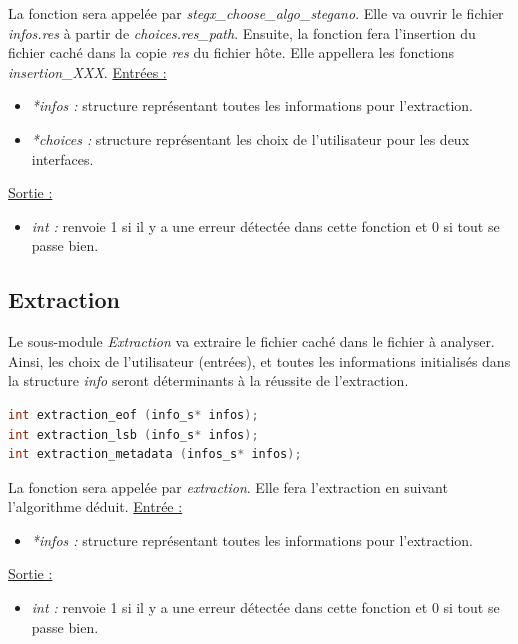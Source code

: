 \documentclass[11pt]{article}
\begin{document}
La fonction sera appelée par \textit{stegx\_choose\_algo\_stegano}.
Elle va ouvrir le fichier \textit{infos.res} à partir de 
\textit{choices.res\_path}. 
Ensuite, la fonction fera l'insertion du fichier caché dans la copie 
\textit{res} du fichier hôte. 
Elle appellera les fonctions \textit{insertion\_XXX}. 
\newline
\underline{Entrées :} 
\begin{itemize}
\item \textit{*infos :} structure représentant toutes les informations pour 
l'extraction.  
\item \textit{*choices :} structure représentant les choix de 
l'utilisateur pour les deux interfaces. 
\end{itemize}
\underline{Sortie :} 
\begin{itemize}
\item \textit{int :} renvoie 1 si il y a une erreur détectée dans cette 
fonction et 0 si tout se passe bien.  
\newline 
\end{itemize}

\subsection{Extraction}

Le sous-module \textit{Extraction} va extraire le fichier caché dans le 
fichier à analyser. Ainsi, les choix de l'utilisateur (entrées), et toutes les
informations initialisés dans la structure \textit{info} seront déterminants 
à la réussite de l'extraction. 

\begin{lstlisting}[language=c]
int extraction_eof (info_s* infos); 
int extraction_lsb (info_s* infos);
int extraction_metadata (infos_s* infos);
\end{lstlisting}

La fonction sera appelée par \textit{extraction}.
Elle fera l'extraction en suivant l'algorithme déduit. 
\newline
\underline{Entrée :} 
\begin{itemize}
\item \textit{*infos :} structure représentant toutes les informations pour 
l'extraction.  
\end{itemize}
\underline{Sortie :} 
\begin{itemize}
\item \textit{int :} renvoie 1 si il y a une erreur détectée dans cette 
fonction et 0 si tout se passe bien.  
\newline 
\end{itemize}
\end{document}
